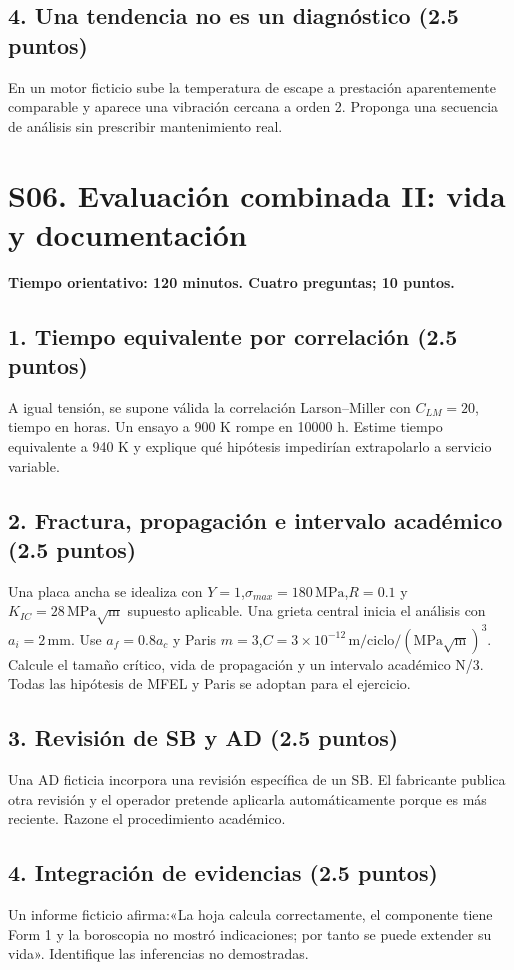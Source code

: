\section*{4. Una tendencia no es un diagnóstico (2.5 puntos)}
En un motor ficticio sube la temperatura de escape a prestación aparentemente comparable y aparece una vibración cercana a orden 2. Proponga una secuencia de análisis sin prescribir mantenimiento real.

\chapter{S06. Evaluación combinada II: vida y documentación}
\noindent\textbf{Tiempo orientativo: 120 minutos. Cuatro preguntas; 10 puntos.}
\section*{1. Tiempo equivalente por correlación (2.5 puntos)}
A igual tensión, se supone válida la correlación Larson--Miller con $C_{LM}=20$, tiempo en horas. Un ensayo a 900 K rompe en 10000 h. Estime tiempo equivalente a 940 K y explique qué hipótesis impedirían extrapolarlo a servicio variable.

\section*{2. Fractura, propagación e intervalo académico (2.5 puntos)}
Una placa ancha se idealiza con $Y=1$,$\sigma_{max}=180\,\mathrm{MPa}$,$R=0.1$ y $K_{IC}=28\,\mathrm{MPa\sqrt m}$ supuesto aplicable. Una grieta central inicia el análisis con $ a_i=2\,\mathrm{mm}$. Use $ a_f=0.8a_c $ y Paris $ m=3$,$C=3\times10^{-12}\,\mathrm{m/ciclo}/(\mathrm{MPa\sqrt m})^3$. Calcule el tamaño crítico, vida de propagación y un intervalo académico N/3. Todas las hipótesis de MFEL y Paris se adoptan para el ejercicio.

\section*{3. Revisión de SB y AD (2.5 puntos)}
Una AD ficticia incorpora una revisión específica de un SB. El fabricante publica otra revisión y el operador pretende aplicarla automáticamente porque es más reciente. Razone el procedimiento académico.

\section*{4. Integración de evidencias (2.5 puntos)}
Un informe ficticio afirma:«La hoja calcula correctamente, el componente tiene Form 1 y la boroscopia no mostró indicaciones; por tanto se puede extender su vida». Identifique las inferencias no demostradas.

